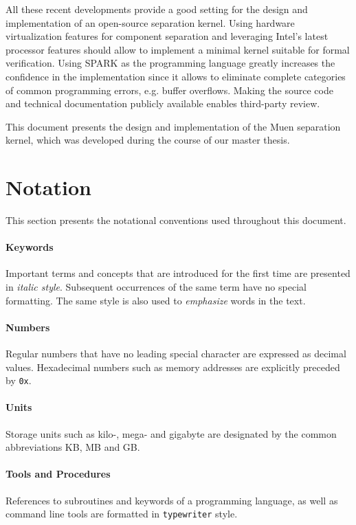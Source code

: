 All these recent developments provide a good setting for the design and
implementation of an open-source separation kernel. Using hardware
virtualization features for component separation and leveraging Intel's latest
processor features should allow to implement a minimal kernel suitable for
formal verification. Using SPARK as the programming language greatly increases
the confidence in the implementation since it allows to eliminate complete
categories of common programming errors, e.g. buffer overflows. Making the
source code and technical documentation publicly available enables third-party
review.

This document presents the design and implementation of the Muen separation
kernel, which was developed during the course of our master thesis.

\section{Notation}
This section presents the notational conventions used throughout this document.

\paragraph{Keywords}
Important terms and concepts that are introduced for the first time are
presented in \emph{italic style}. Subsequent occurrences of the same term have
no special formatting. The same style is also used to \emph{emphasize} words in
the text.

\paragraph{Numbers}
Regular numbers that have no leading special character are expressed as decimal
values. Hexadecimal numbers such as memory addresses are explicitly preceded by
\texttt{0x}.

\paragraph{Units}
Storage units such as kilo-, mega- and gigabyte are designated by
the common abbreviations KB, MB and GB.

\paragraph{Tools and Procedures}
References to subroutines and keywords of a programming language, as well as
command line tools are formatted in \texttt{typewriter} style.

